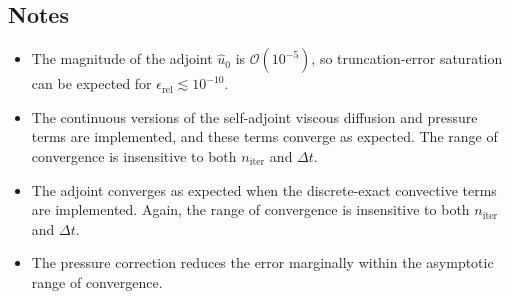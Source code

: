 \documentclass[letterpaper,10pt]{article}
\numberwithin{equation}{section}
\begin{document}
\subsection{Notes}
\begin{itemize}
  
\item The magnitude of the adjoint $\widehat{u}_0$ is $\mathcal{O}(10^{-5})$, so truncation-error saturation can be expected for $\epsilon_\mathrm{rel}\lesssim 10^{-10}$.

\item The continuous versions of the self-adjoint viscous diffusion and pressure terms are implemented, and these terms converge as expected. The range of convergence is insensitive to both $n_\mathrm{iter}$ and $\Delta t$.

\item The adjoint converges as expected when the discrete-exact convective terms are implemented. Again, the range of convergence is insensitive to both $n_\mathrm{iter}$ and $\Delta t$.

\item The pressure correction reduces the error marginally within the asymptotic range of convergence.
  
\end{itemize}
\end{document}
